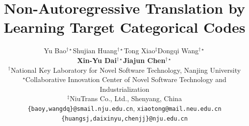 %
%

\title{Non-Autoregressive Translation by Learning Target Categorical Codes}

\author{Yu Bao$^{\dag\star}$\quad Shujian Huang$^{\dag\star}$\quad Tong Xiao$^{\ddag}$\quad Dongqi Wang$^{\dag\star}$\\
\textbf{Xin-Yu Dai$^{\dag\star}$\quad Jiajun Chen$^{\dag\star}$}\\
$^{\dag}$National Key Laboratory for Novel Software Technology, Nanjing University \\ $^{\star}$Collaborative Innovation Center of Novel Software Technology and Industrialization\\
$^{\ddag}$NiuTrans Co., Ltd., Shenyang, China\\
\texttt{\{baoy,wangdq\}@smail.nju.edu.cn}, \texttt{xiaotong@mail.neu.edu.cn} \\
\texttt{\{huangsj,daixinyu,chenjj\}@nju.edu.cn}
}




